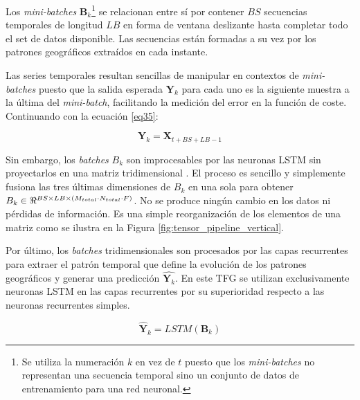 Los \textit{mini-batches} $\textbf{B}_k$\footnote{Se utiliza la numeración $k$ en vez de $t$ puesto que los \textit{mini-batches} no representan una secuencia temporal sino un conjunto de datos de entrenamiento para una red neuronal.} se relacionan entre sí por contener $BS$ secuencias temporales de longitud $LB$ en forma de ventana deslizante hasta completar todo el set de datos disponible. Las secuencias están formadas a su vez por los patrones geográficos extraídos en cada instante.

Las series temporales resultan sencillas de manipular en contextos de \textit{mini-batches} puesto que la salida esperada $\textbf{Y}_k$ para cada uno es la siguiente muestra a la última del \textit{mini-batch}, facilitando la medición del error en la función de coste. Continuando con la ecuación \ref{eq35}:

\begin{equation}
	\textbf{Y}_k = \textbf{X}_{t+BS+LB-1}
\end{equation}

Sin embargo, los \textit{batches} $B_k$ son improcesables por las neuronas LSTM sin proyectarlos en una matriz tridimensional \cite{machinelearningbook,lstm2}. El proceso es sencillo y simplemente fusiona las tres últimas dimensiones de $B_k$ en una sola para obtener $B_k \in \real^{BS\times LB\times (M_{total}\cdot N_{total}\cdot F)}$. No se produce ningún cambio en los datos ni pérdidas de información. Es una simple reorganización de los elementos de una matriz como se ilustra en la Figura \ref{fig:tensor_pipeline_vertical}.

Por último, los \textit{batches} tridimensionales son procesados por las capas recurrentes para extraer el patrón temporal que define la evolución de los patrones geográficos y generar una predicción $\hat{\textbf{Y}_k}$. En este TFG se utilizan exclusivamente neuronas LSTM en las capas recurrentes por su superioridad respecto a las neuronas recurrentes simples.

\begin{equation}
	\hat{\textbf{Y}}_k = LSTM(\textbf{B}_k)
\end{equation}

